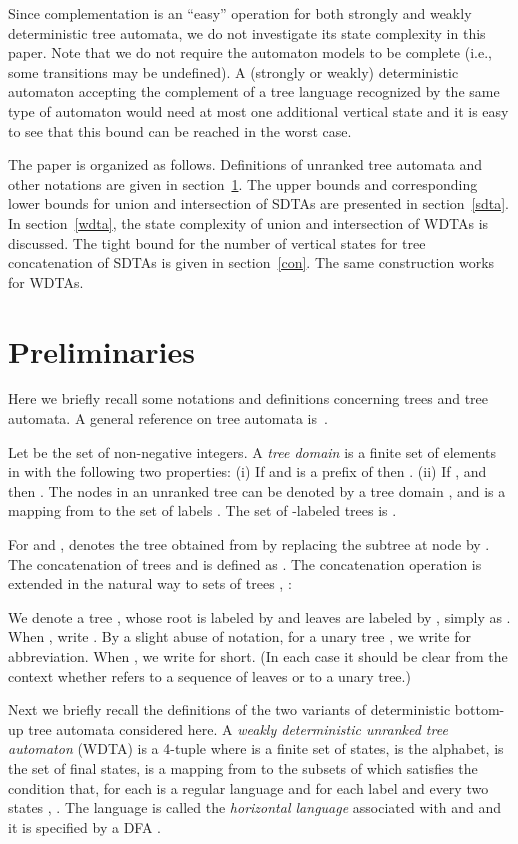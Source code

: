 \documentclass[copyright]{eptcs}
\begin{document}
Since complementation is an ``easy'' operation for both strongly
and weakly deterministic tree automata, we do not investigate its
state complexity in this paper. Note that we do not require the
automaton models to be complete (i.e., some transitions may be
undefined). A (strongly or weakly) deterministic automaton
accepting the complement of a tree language recognized by the same
type of automaton would need at most one additional vertical state
and it is easy to see that this bound can be reached in the worst
case.

The  paper is organized as follows. Definitions of
unranked tree automata and other notations are given in
section~\ref{pre}. The upper bounds and corresponding
lower bounds  for union and
intersection of SDTAs are presented in section~\ref{sdta}. In
section~\ref{wdta}, the state complexity of union and
intersection of WDTAs is discussed. The tight bound for the
number of vertical
states for tree concatenation of SDTAs is
given in section~\ref{con}. The same construction works for
WDTAs.


\section{Preliminaries}\label{pre}

Here we briefly recall some notations and definitions concerning
trees and tree automata. A general reference on tree automata
is~\cite{CDG}.

Let  be the set of non-negative integers. A {\em tree
domain}  is a finite set of elements in  with the
following two properties: (i) If  and  is a prefix of
 then . (ii) If ,  and  then
. The nodes in an unranked tree  can be denoted by a
tree domain , and  is a mapping from  to the
set of labels . The set of -labeled trees is
.

For  and , 
denotes the tree obtained from  by replacing the subtree at
node  by . The concatenation of trees  and  is
defined as
.
The concatenation operation is extended in the
natural way to sets of trees , : 

We denote a tree , whose root is
labeled by  and leaves are labeled by ,
simply as . When , write
. By a slight abuse of notation, for a unary tree , we write  for abbreviation. When , we write 
for short. (In each case it should be clear from the context
whether  refers to a sequence of leaves or to a unary tree.)


Next we briefly recall the definitions of the two variants of
deterministic bottom-up tree automata considered here.
A {\em weakly deterministic unranked tree automaton} (WDTA) is a
4-tuple  where  is a finite set of
states,  is the alphabet,  is the set of
final states,  is a mapping from  to the
subsets of 
which satisfies the condition that, for each  is a regular language
and for each label  and every two states ,
. The
language  is called the {\em horizontal
language} associated with  and  and it is specified
by a DFA .
\end{document}
